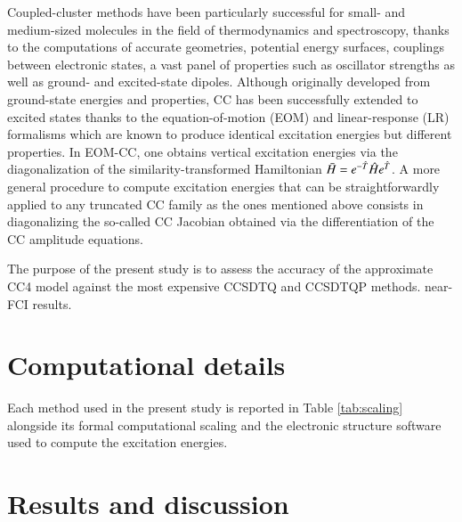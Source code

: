 \documentclass[aip,jcp,reprint,noshowkeys,superscriptaddress]{revtex4-1}
\newcommand{\hH}{\Hat{H}}
\newcommand{\hT}{\Hat{T}}
\newcommand{\bH}{\Bar{H}}
\begin{document}
Coupled-cluster methods have been particularly successful for small- and medium-sized molecules in the field of thermodynamics and spectroscopy, thanks to the computations of accurate geometries, potential energy surfaces, couplings between electronic states, a vast panel of properties such as oscillator strengths as well as ground- and excited-state dipoles.
Although originally developed from ground-state energies and properties, CC has been successfully extended to excited states thanks to the equation-of-motion (EOM) and linear-response (LR) formalisms which are known to produce identical excitation energies but different properties.
In EOM-CC, one obtains vertical excitation energies via the diagonalization of the similarity-transformed Hamiltonian $\bH = e^{-\hT} \hH e^{\hT}$.
A more general procedure to compute excitation energies that can be straightforwardly applied to any truncated CC family as the ones mentioned above consists in diagonalizing the so-called CC Jacobian obtained via the differentiation of the CC amplitude equations.

The purpose of the present study is to assess the accuracy of the approximate CC4 model against the most expensive CCSDTQ and CCSDTQP methods.
near-FCI results.

\section{Computational details}

Each method used in the present study is reported in Table \ref{tab:scaling} alongside its formal computational scaling and the electronic structure software used to compute the excitation energies.

\section{Results and discussion}
\end{document}
